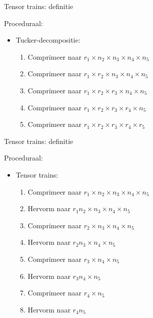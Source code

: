 \documentclass[t,12pt,dutch
\ifx\beamermode\undefined\else,\beamermode\fi
]{beamer}
\begin{document}
\begin{frame}{Tensor trains: definitie}

Proceduraal:
\begin{itemize}
\item Tucker-decompositie:
\begin{enumerate}
\item Comprimeer naar $r_1 \times n_2 \times n_3 \times n_4 \times n_5$
\item Comprimeer naar $r_1 \times r_2 \times n_3 \times n_4 \times n_5$
\item Comprimeer naar $r_1 \times r_2 \times r_3 \times n_4 \times n_5$
\item Comprimeer naar $r_1 \times r_2 \times r_3 \times r_4 \times n_5$
\item Comprimeer naar $r_1 \times r_2 \times r_3 \times r_4 \times r_5$
\end{enumerate}
\end{itemize}

\end{frame}

\begin{frame}{Tensor trains: definitie}

Proceduraal:
\begin{itemize}
\item Tensor trains:
\begin{enumerate}
\item Comprimeer naar $r_1 \times n_2 \times n_3 \times n_4 \times n_5$
\item Hervorm naar $r_1 n_2 \times n_3 \times n_4 \times n_5$
\item Comprimeer naar $r_2 \times n_3 \times n_4 \times n_5$
\item Hervorm naar $r_2 n_3 \times n_4 \times n_5$
\item Comprimeer naar $r_3 \times n_4 \times n_5$
\item Hervorm naar $r_3 n_4 \times n_5$
\item Comprimeer naar $r_4 \times n_5$
\item Hervorm naar $r_4 n_5$
\end{enumerate}
\end{itemize}

\end{frame}
\end{document}
